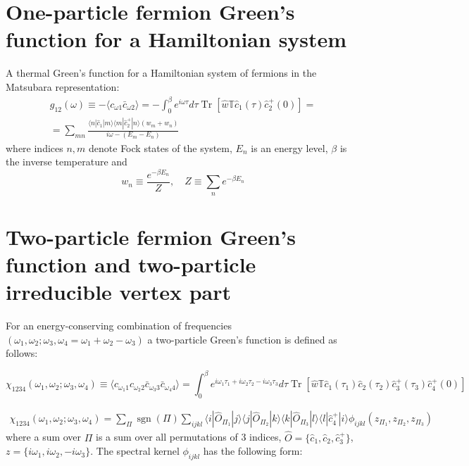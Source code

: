 \documentclass{article}
\DeclareMathOperator*{\sgn}{sgn}
\DeclareMathOperator*{\Tr}{Tr}
\begin{document}
\section{One-particle fermion Green's function for a Hamiltonian system}

A thermal Green's function for a Hamiltonian system of fermions in the Matsubara representation:
\begin{eqnarray*}
    g_{12}(\omega) \equiv -\langle c_{\omega 1} \bar c_{\omega 2} \rangle = 
    -\int_0^\beta e^{i\omega\tau} d\tau \Tr [\hat w\mathbb{T} \hat c_1(\tau) \hat c^+_2(0)] =\\=
        \sum_{mn}\frac{\langle n|\hat c_1|m\rangle\langle m|\hat c^+_2|n\rangle(w_m+w_n)}
            {i\omega - (E_m-E_n)}
\end{eqnarray*}
where indices $n, m$ denote Fock states of the system, $E_n$ is an energy level, $\beta$ is the inverse
temperature and
\[
    w_n \equiv \frac{e^{-\beta E_n}}{Z}, \quad Z \equiv \sum_n e^{-\beta E_n}
\]

\section{Two-particle fermion Green's function and two-particle irreducible vertex part}

For an energy-conserving combination of frequencies $(\omega_1, \omega_2; \omega_3, \omega_4 = \omega_1+\omega_2-\omega_3)$
a two-particle Green's function is defined as follows:

\begin{equation*}
    \chi_{1234}(\omega_1,\omega_2;\omega_3,\omega_4) \equiv 
        \langle c_{\omega_1 1} c_{\omega_2 2} \bar c_{\omega_3 3} \bar c_{\omega_4 4} \rangle = 
        \int_0^\beta e^{i\omega_1\tau_1 + i\omega_2\tau_2 - i\omega_3\tau_3} d\tau 
            \Tr [\hat w\mathbb{T} \hat c_1(\tau_1) \hat c_2(\tau_2) \hat c^+_3(\tau_3) \hat c^+_4(0)]
\end{equation*}

\begin{eqnarray*}
    \chi_{1234}(\omega_1,\omega_2;\omega_3,\omega_4) =
            \sum_{\Pi}\sgn(\Pi)\sum_{ijkl}
                \langle i|\hat O_{\Pi_1}|j\rangle \langle j|\hat O_{\Pi_2}|k\rangle
                \langle k|\hat O_{\Pi_3}|l\rangle \langle l|\hat c_4^+|i\rangle 
            \phi_{ijkl}(z_{\Pi_1},z_{\Pi_2},z_{\Pi_3})
\end{eqnarray*}
where a sum over $\Pi$ is a sum over all permutations of 3 indices, $\hat O = \{\hat c_1, \hat c_2, \hat c^+_3\}$,
$z = \{i\omega_1, i\omega_2, -i\omega_3\}$. The spectral kernel $\phi_{ijkl}$ has the following form:
\end{document}
